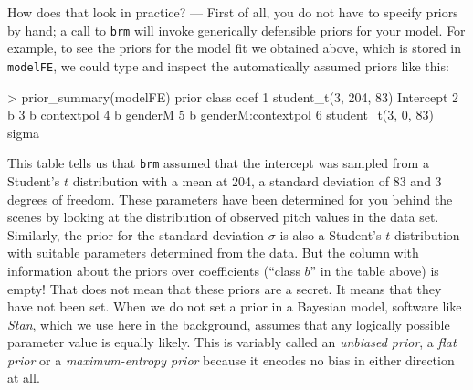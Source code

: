 \documentclass[nobib]{tufte-handout}
\begin{document}
How does that look in practice? --- First of all, you do not have to specify priors by hand; a call to \texttt{brm} will invoke generically defensible priors for your model. For example, to see the priors for the model fit we obtained above, which is stored in \texttt{modelFE}, we could type and inspect the automatically assumed priors like this:

\medskip

\begin{minipage}[]{\textwidth}
\begin{rc}
> prior_summary(modelFE)
                  prior     class               coef 
1 student_t(3, 204, 83) Intercept                    
2                               b                    
3                               b         contextpol 
4                               b            genderM 
5                               b genderM:contextpol 
6   student_t(3, 0, 83)     sigma  
\end{rc}
\end{minipage}

This table tells us that \texttt{brm} assumed that the intercept was sampled from a Student's $t$ distribution with a mean at 204, a standard deviation of 83 and 3 degrees of freedom. These parameters have been determined for you behind the scenes by looking at the distribution of observed pitch values in the data set.
%
%
Similarly, the prior for the standard deviation $\sigma$ is also a Student's $t$ distribution with suitable parameters determined from the data.
But the column with information about the priors over coefficients (``class $b$'' in the table above) is empty!
That does not mean that these priors are a secret.
It means that they have not been set.
When we do not set a prior in a Bayesian model, software like \emph{Stan}, which we use here in the background, assumes that any logically possible parameter value is equally likely.
This is variably called an \textit{unbiased prior}, a \textit{flat prior} or a \textit{maximum-entropy prior} because it encodes no bias in either direction at all.
\end{document}
